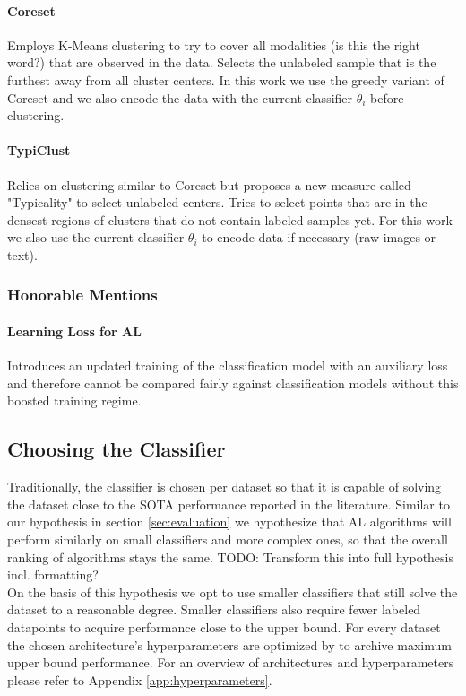 \documentclass[]{article}
\begin{document}
\paragraph{Coreset \cite{sener2017active}}
Employs K-Means clustering to try to cover all {\color{red}modalities (is this the right word?)} that are observed in the data.
Selects the unlabeled sample that is the furthest away from all cluster centers.
In this work we use the greedy variant of Coreset and we also encode the data with the current classifier $\theta_i$ before clustering.
\paragraph{TypiClust}
Relies on clustering similar to Coreset but proposes a new measure called "Typicality" to select unlabeled centers.
Tries to select points that are in the densest regions of clusters that do not contain labeled samples yet.
For this work we also use the current classifier $\theta_i$ to encode data if necessary (raw images or text).
%
\subsubsection{Honorable Mentions}
\paragraph{Learning Loss for AL}
Introduces an updated training of the classification model with an auxiliary loss and therefore cannot be compared fairly against classification models without this boosted training regime.

\subsection{Choosing the Classifier}\label{sec:choosing_the_classifier}
Traditionally, the classifier is chosen per dataset so that it is capable of solving the dataset close to the SOTA performance reported in the literature.
Similar to our hypothesis in section \ref{sec:evaluation} we hypothesize that AL algorithms will perform similarly on small classifiers and more complex ones, so that the overall ranking of algorithms stays the same.
{\color{red} TODO: Transform this into full hypothesis incl. formatting?}\\
On the basis of this hypothesis we opt to use smaller classifiers that still solve the dataset to a reasonable degree.
Smaller classifiers also require fewer labeled datapoints to acquire performance close to the upper bound.
For every dataset the chosen architecture's hyperparameters are optimized by to archive maximum upper bound performance.
For an overview of architectures and hyperparameters please refer to Appendix \ref{app:hyperparameters}.
\end{document}
